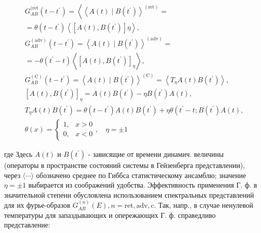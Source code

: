 \documentclass[10pt]{article}
\begin{document}
\[

\begin{aligned}

& G_{A B}^{(\mathrm{ret}}\left(t-t^{\prime}\right)=\left\langle\left\langle A(t) \mid B\left(t^{\prime}\right)\right\rangle^{(\mathrm{ret})}=\right. \\

& =\theta\left(t-t^{\prime}\right)\left\langle\left[A(t), B\left(t^{\prime}\right)\right] \eta\right\rangle, \\

& G_{A B}^{(\mathrm{adv})}\left(t-t^{\prime}\right)=\left\langle A(t) \mid B\left(t^{\prime}\right)\right\rangle^{(\mathrm{adv})}= \\

& =-\theta\left(t^{\prime}-t\right)\left\langle\left[A(t), B\left(t^{\prime}\right)\right]_{\eta}\right\rangle, \\

& G_{A B}^{(\mathrm{C})}\left(t-t^{\prime}\right)=\left\langle A(t) \mid B\left(t^{\prime}\right)\right\rangle^{(\mathrm{C})}=\left\langle T_{\eta} A(t) B\left(t^{\prime}\right)\right\rangle, \\

& {\left[A(t), B\left(t^{\prime}\right)\right]_{\eta}=A(t) B\left(t^{\prime}\right)-\eta B\left(t^{\prime}\right) A(t),} \\

& T_{\eta} A(t) B\left(t^{\prime}\right)=\theta\left(t-t^{\prime}\right) A(t) B\left(t^{\prime}\right)+\eta \theta\left(t^{\prime}-t ; B\left(t^{\prime}\right) A(t),\right. \\

& \theta(x)=\left\{\begin{array}{ll}

1, & x>0 \\

0, & x<0

\end{array}, \quad \eta= \pm 1\right.

\end{aligned}

\]



где Здесь $A(t)$ и $B\left(t^{\prime}\right)$ - зависящие от времени динамич. величины (операторы в пространстве состояний системы в Гейзенберга представлении), через $\langle\cdots\rangle$ обозначено среднее по Гиббса статистическому ансамблю; значение $\eta= \pm 1$ выбирается из соображений удобства. Эффективность применения Г. ф. в значительной степени обусловлена использованием спектральных представлений для их фурье-образов $G_{A B}^{(n)}(E), n=\mathrm{ret}, \mathrm{adv}, \mathrm{c}$. Так, напр., в случае ненулевой температуры для запаздывающих и опережающих Г. ф. справедливо представление:
\end{document}
